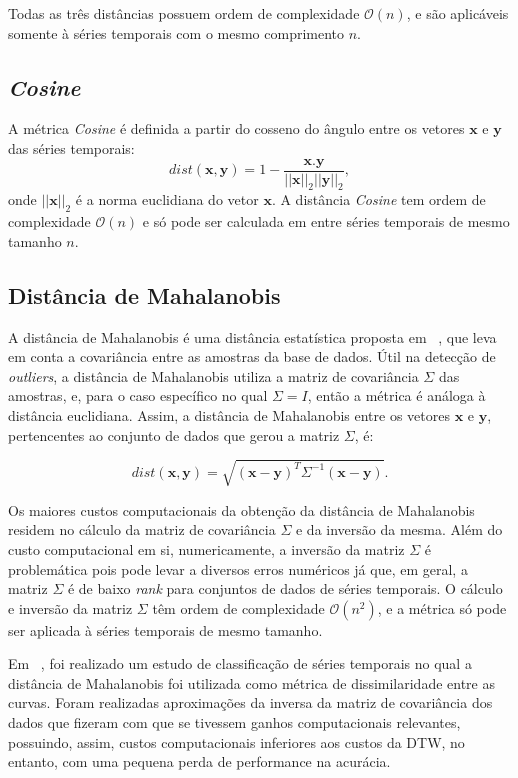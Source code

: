 Todas as três distâncias possuem ordem de complexidade $\mathcal{O}(n)$, e são aplicáveis somente à séries temporais com o mesmo comprimento $n$.

\subsection{\emph{Cosine}}

A métrica \emph{Cosine} é definida  a partir do cosseno do ângulo entre os vetores $\bm{x}$ e $\bm{y}$ das séries temporais:
\begin{equation}
dist(\bm{x},\bm{y}) = 1- \frac{\bm{x}.\bm{y}}{||\bm{x}||_2 ||\bm{y}||_2},
\end{equation}
onde $||\bm{x}||_2$ é a norma euclidiana do vetor $\bm{x}$. A distância \emph{Cosine} tem ordem de complexidade $\mathcal{O}(n)$ e só pode ser calculada em entre séries temporais de mesmo tamanho $n$.

\subsection{Distância de Mahalanobis}

A distância de Mahalanobis é uma distância estatística proposta em ~\parencite{mahalanobis1936generalized}, que leva em conta a covariância entre as amostras da base de dados. Útil na detecção de \emph{outliers}, a distância de Mahalanobis utiliza a matriz de covariância $\Sigma$ das amostras, e, para o caso específico no qual $\Sigma=I$, então a métrica é análoga à distância euclidiana. Assim, a distância de Mahalanobis entre os vetores $\bm{x}$ e $\bm{y}$, pertencentes ao conjunto de dados que gerou a matriz $\Sigma$, é:

\begin{equation}
dist(\bm{x},\bm{y}) = \sqrt{(\bm{x}-\bm{y})^T\Sigma^{-1}(\bm{x}-\bm{y})}.
\end{equation}

Os maiores custos computacionais da obtenção da distância de Mahalanobis residem no cálculo da matriz de covariância $\Sigma$ e da inversão da mesma. Além do custo computacional em si, numericamente, a inversão da matriz $\Sigma$ é problemática pois pode levar a diversos erros numéricos já que, em geral, a matriz $\Sigma$ é de baixo \emph{rank} para conjuntos de dados de séries temporais. O cálculo e inversão da matriz $\Sigma$ têm ordem de complexidade $\mathcal{O}(n^2)$, e a métrica só pode ser aplicada à séries temporais de mesmo tamanho.

Em ~\parencite{mahalanobisClassification}, foi realizado um estudo de classificação de séries temporais no qual a distância de Mahalanobis foi utilizada como métrica de dissimilaridade entre as curvas. Foram realizadas aproximações da inversa da matriz de covariância dos dados que fizeram com que se tivessem ganhos computacionais relevantes, possuindo, assim, custos computacionais inferiores aos custos da DTW, no entanto, com uma pequena perda de performance na acurácia.

